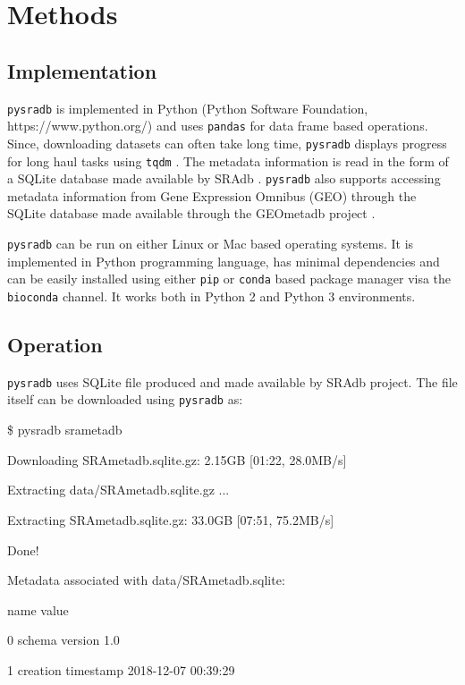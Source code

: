 \documentclass[9pt,a4paper]{extarticle}
\newenvironment{allintypewriter}{\ttfamily}{\par}
\begin{document}
\section*{Methods}

\subsection*{Implementation}
\texttt{pysradb} is implemented in Python (Python Software Foundation, https://www.python.org/) \cite{vanRossum:2011:PLR:2011965}
and uses \texttt{pandas} \cite{mckinney-proc-scipy-2010} for
data frame based operations. Since, downloading datasets can often take long time,
\texttt{pysradb} displays progress for long haul tasks using \texttt{tqdm} \cite{casper_da_costa_luis_2018_1211527}.
The metadata information is read in the form of a SQLite \cite{about_sqlite} database made available by SRAdb \cite{zhu2013sradb}. \texttt{pysradb} also supports accessing metadata 
information from Gene Expression Omnibus (GEO)
 \cite{edgar2002gene,barrett2012ncbi} through the SQLite database made available 
through the GEOmetadb project \cite{zhu2008geometadb}.

\texttt{pysradb} can be run on either Linux or Mac based operating systems. It is 
implemented in Python programming language, has minimal dependencies and can be easily installed using either \texttt{pip} or \texttt{conda} based package manager visa the \texttt{bioconda} \cite{gruning2018bioconda} channel. It works both in Python 2 and Python 3 environments.

\subsection*{Operation}

\texttt{pysradb} uses SQLite file produced and made available by SRAdb \cite{zhu2013sradb} project. The file itself can be downloaded using \texttt{pysradb} as:

\begin{allintypewriter}
\$ pysradb srametadb

Downloading SRAmetadb.sqlite.gz: 2.15GB [01:22, 28.0MB/s]   

Extracting data/SRAmetadb.sqlite.gz ...

Extracting SRAmetadb.sqlite.gz: 33.0GB [07:51, 75.2MB/s]

Done!

Metadata associated with data/SRAmetadb.sqlite:

                 name                value

0      schema version                  1.0

1  creation timestamp  2018-12-07 00:39:29

\end{allintypewriter}
\end{document}
